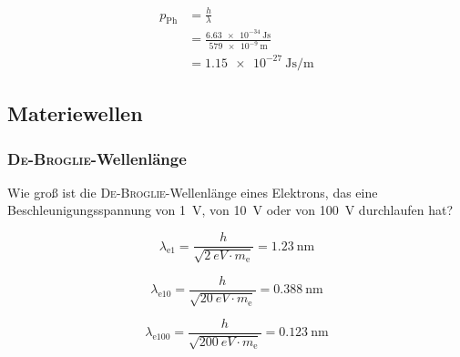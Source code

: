 \documentclass{ajc}
\begin{document}
	\begin{equation}
		\begin{split}
			p_\text{Ph} &= \frac{h}{\lambda} \\
						&= \frac{\SI{6,63e-34}{\J\s}}{\SI{579e-9}{\m}} \\
						&= \SI{1,15e-27}{\J\s\per\m}
		\end{split}
	\end{equation}
	
	\newpage
	
	\subsection{Materiewellen}
	
	\subsubsection{\textsc{D\lowercase{e}-B\lowercase{roglie}}-Wellenlänge}
	Wie groß ist die \textsc{De-Broglie}-Wellenlänge eines Elektrons, das eine Beschleunigungsspannung von \SI{1}{\volt}, von \SI{10}{\volt} oder von \SI{100}{\volt} durchlaufen hat?
	
	\begin{equation}
		\lambda_\text{e1} = \frac{h}{\sqrt{\SI{2}{eV} \cdot m_\text{e}}} = \SI{1,23}{\nm}
	\end{equation}
	
	\begin{equation}
		\lambda_\text{e10} = \frac{h}{\sqrt{\SI{20}{eV} \cdot m_\text{e}}} = \SI{0,388}{\nm}
	\end{equation}
	
	\begin{equation}
		\lambda_\text{e100} = \frac{h}{\sqrt{\SI{200}{eV} \cdot m_\text{e}}} = \SI{0,123}{\nm}
	\end{equation}
\end{document}

